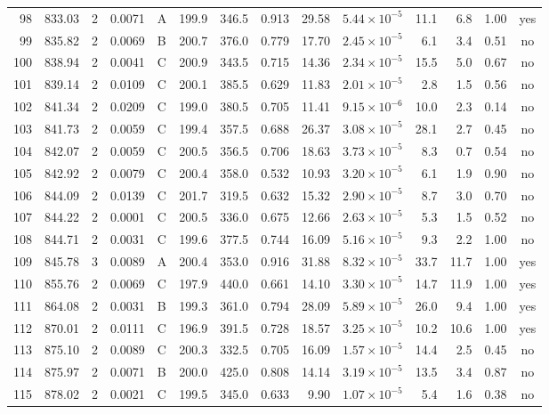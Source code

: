 \begin{landscape}
\begin{longtable}{rrrrlrrrrrrrrc}
98 & 833.03 & 2 & 0.0071 & A & 199.9 & 346.5 & 0.913 & 29.58 & $5.44\times10^{-5}$ & 11.1 & 6.8 & 1.00 & yes \\
99 & 835.82 & 2 & 0.0069 & B & 200.7 & 376.0 & 0.779 & 17.70 & $2.45\times10^{-5}$ & 6.1 & 3.4 & 0.51 & no \\
100 & 838.94 & 2 & 0.0041 & C & 200.9 & 343.5 & 0.715 & 14.36 & $2.34\times10^{-5}$ & 15.5 & 5.0 & 0.67 & no \\
101 & 839.14 & 2 & 0.0109 & C & 200.1 & 385.5 & 0.629 & 11.83 & $2.01\times10^{-5}$ & 2.8 & 1.5 & 0.56 & no \\
102 & 841.34 & 2 & 0.0209 & C & 199.0 & 380.5 & 0.705 & 11.41 & $9.15\times10^{-6}$ & 10.0 & 2.3 & 0.14 & no \\
103 & 841.73 & 2 & 0.0059 & C & 199.4 & 357.5 & 0.688 & 26.37 & $3.08\times10^{-5}$ & 28.1 & 2.7 & 0.45 & no \\
104 & 842.07 & 2 & 0.0059 & C & 200.5 & 356.5 & 0.706 & 18.63 & $3.73\times10^{-5}$ & 8.3 & 0.7 & 0.54 & no \\
105 & 842.92 & 2 & 0.0079 & C & 200.4 & 358.0 & 0.532 & 10.93 & $3.20\times10^{-5}$ & 6.1 & 1.9 & 0.90 & no \\
106 & 844.09 & 2 & 0.0139 & C & 201.7 & 319.5 & 0.632 & 15.32 & $2.90\times10^{-5}$ & 8.7 & 3.0 & 0.70 & no \\
107 & 844.22 & 2 & 0.0001 & C & 200.5 & 336.0 & 0.675 & 12.66 & $2.63\times10^{-5}$ & 5.3 & 1.5 & 0.52 & no \\
108 & 844.71 & 2 & 0.0031 & C & 199.6 & 377.5 & 0.744 & 16.09 & $5.16\times10^{-5}$ & 9.3 & 2.2 & 1.00 & no \\
109 & 845.78 & 3 & 0.0089 & A & 200.4 & 353.0 & 0.916 & 31.88 & $8.32\times10^{-5}$ & 33.7 & 11.7 & 1.00 & yes \\
110 & 855.76 & 2 & 0.0069 & C & 197.9 & 440.0 & 0.661 & 14.10 & $3.30\times10^{-5}$ & 14.7 & 11.9 & 1.00 & yes \\
111 & 864.08 & 2 & 0.0031 & B & 199.3 & 361.0 & 0.794 & 28.09 & $5.89\times10^{-5}$ & 26.0 & 9.4 & 1.00 & yes \\
112 & 870.01 & 2 & 0.0111 & C & 196.9 & 391.5 & 0.728 & 18.57 & $3.25\times10^{-5}$ & 10.2 & 10.6 & 1.00 & yes \\
113 & 875.10 & 2 & 0.0089 & C & 200.3 & 332.5 & 0.705 & 16.09 & $1.57\times10^{-5}$ & 14.4 & 2.5 & 0.45 & no \\
114 & 875.97 & 2 & 0.0071 & B & 200.0 & 425.0 & 0.808 & 14.14 & $3.19\times10^{-5}$ & 13.5 & 3.4 & 0.87 & no \\
115 & 878.02 & 2 & 0.0021 & C & 199.5 & 345.0 & 0.633 & 9.90 & $1.07\times10^{-5}$ & 5.4 & 1.6 & 0.38 & no \\

\end{longtable}
\end{landscape}

